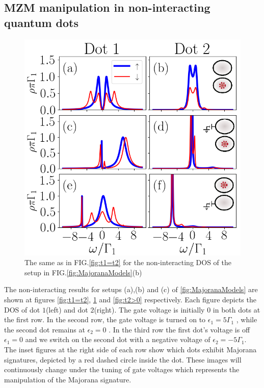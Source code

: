 \documentclass[showpacs,aps,prb,reprint,superscriptaddress]{revtex4-1}
\begin{document}
     \subsection{MZM manipulation in non-interacting quantum dots \label{subsect:non-int}}

     

\begin{figure}[bt]
\begin{center}
\includegraphics[scale=0.48]{Graficos/t1>0.png}
\caption{  \label{fig:t1>0} The same as in FIG.\ref{fig:t1=t2} for the non-interacting DOS of the setup in FIG.\ref{fig:MajoranaModels}(b) 
}
%
\end{center}
\end{figure}


 	  The non-interacting results for setups (a),(b) and (c) of \ref{fig:MajoranaModels} are shown at figures \ref{fig:t1=t2}, \ref{fig:t1>0} and \ref{fig:t2>0} respectively. Each figure depicts the DOS of dot $1$(left) and dot $2$(right). The gate voltage is initially $0$ in both dots at the first row. In the second row, the gate voltage is turned on to  $\epsilon_1 = 5\Gamma_1$ , while the second dot remains at $\epsilon_2 = 0$ . In the third row the first dot's voltage is off $\epsilon_1=0$ and we switch on the second dot with a negative voltage of $\epsilon_2 = -5\Gamma_1$. The inset figures at the right side of each row show which dots exhibit Majorana signatures, depicted by a red dashed circle inside the dot. These images will continuously change under the tuning of gate voltages which represents the manipulation of the Majorana signature.
\end{document}
